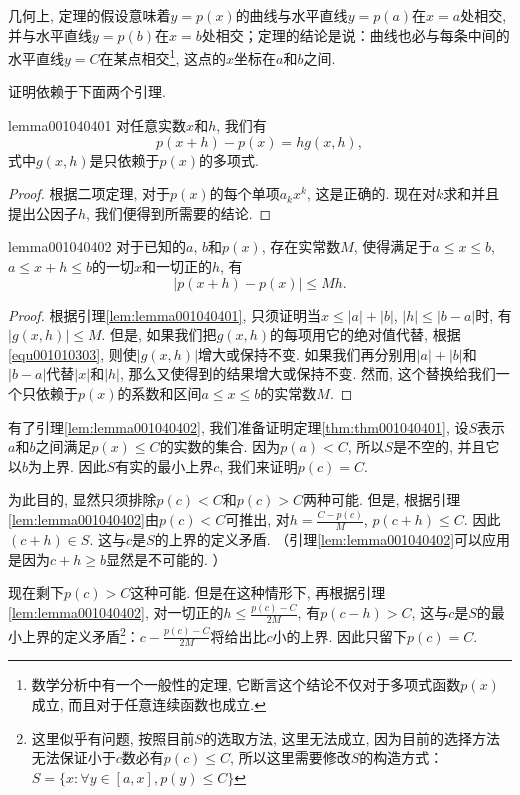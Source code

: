 几何上, 定理的假设意味着$y=p(x)$的曲线与水平直线$y=p(a)$在$x=a$处相交, 并与水平直线$y=p(b)$在$x=b$处相交；定理的结论是说：曲线也必与每条中间的水平直线$y=C$在某点相交\footnote{数学分析中有一个一般性的定理, 它断言这个结论不仅对于多项式函数$p(x)$成立, 而且对于任意连续函数也成立. }, 这点的$x$坐标在$a$和$b$之间. 

证明依赖于下面两个引理. 

\begin{lemma}{}{lemma001040401}
对任意实数$x$和$h$, 我们有
\[
p(x+h) - p(x) = hg(x, h),
\]
式中$g(x, h)$是只依赖于$p(x)$的多项式. 
\end{lemma}

\begin{proof}
根据二项定理, 对于$p(x)$的每个单项$a_kx^k$, 这是正确的. 现在对$k$求和并且提出公因子$h$, 我们便得到所需要的结论. 
\end{proof}

\begin{lemma}{}{lemma001040402}
对于已知的$a$, $b$和$p(x)$, 存在实常数$M$, 使得满足于$a \le x \le b$, $a \le x+h \le b$的一切$x$和一切正的$h$, 有
\[
|p(x+h) - p(x)| \le Mh.
\]
\end{lemma}

\begin{proof}
根据引理\ref{lem:lemma001040401}, 只须证明当$x \le |a| + |b|$, $|h| \le |b-a|$时, 有$|g(x, h)| \le M$. 但是, 如果我们把$g(x, h)$的每项用它的绝对值代替, 根据\ref{equ001010303}, 则使$|g(x, h)|$增大或保持不变. 如果我们再分别用$|a| + |b|$和$|b-a|$代替$|x|$和$|h|$, 那么又使得到的结果增大或保持不变. 然而, 这个替换给我们一个只依赖于$p(x)$的系数和区间$a \le x \le b$的实常数$M$. 
\end{proof}

有了引理\ref{lem:lemma001040402}, 我们准备证明定理\ref{thm:thm001040401}, 设$S$表示$a$和$b$之间满足$p(x) \le C$的实数的集合. 因为$p(a) < C$, 所以$S$是不空的, 并且它以$b$为上界. 因此$S$有实的最小上界$c$, 我们来证明$p(c)=C$. 

为此目的, 显然只须排除$p(c)<C$和$p(c)>C$两种可能. 但是, 根据引理\ref{lem:lemma001040402}由$p(c)<C$可推出, 对$h=\frac{C-p(c)}{M}$, $p(c+h) \le C$. 因此$(c+h) \in S$. 这与$c$是$S$的上界的定义矛盾. （引理\ref{lem:lemma001040402}可以应用是因为$c+h \ge b$显然是不可能的. ）

现在剩下$p(c)>C$这种可能. 但是在这种情形下, 再根据引理\ref{lem:lemma001040402}, 对一切正的$h \le \frac{p(c)-C}{2M}$, 有$p(c-h)>C$, 这与$c$是$S$的最小上界的定义矛盾\footnote{这里似乎有问题, 按照目前$S$的选取方法, 这里无法成立, 因为目前的选择方法无法保证小于$c$数必有$p(c)\le C$, 所以这里需要修改$S$的构造方式：$S=\{x:\forall y \in [a, x], p(y) \le C\}$}：$c - \frac{p(c)-C}{2M}$将给出比$c$小的上界. 因此只留下$p(c)=C$. 

